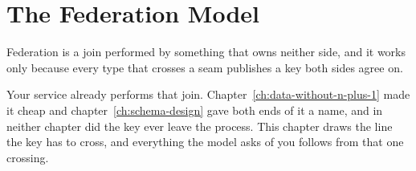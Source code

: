 \chapter{The Federation Model}
\label{ch:federation-model}

Federation is a join performed by something that owns neither side, and it
works only because every type that crosses a seam publishes a key both sides
agree on.

Your service already performs that join. Chapter~\ref{ch:data-without-n-plus-1}
made it cheap and chapter~\ref{ch:schema-design} gave both ends of it a name,
and in neither chapter did the key ever leave the process. This chapter draws
the line the key has to cross, and everything the model asks of you follows
from that one crossing.









